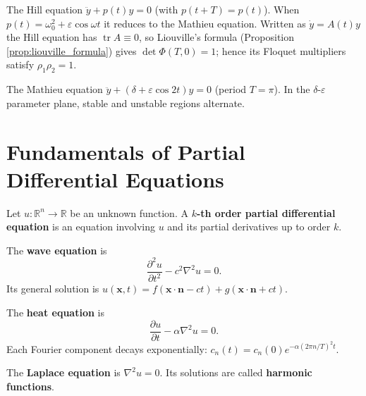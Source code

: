 \begin{example}\label{ex:hill_equation}
The Hill equation $\ddot{y} + p(t) y = 0$ (with $p(t+T) = p(t)$). When $p(t) = \omega_0^2 + \varepsilon \cos \omega t$ it reduces to the Mathieu equation. Written as $\dot y=A(t)y$ the Hill equation has $\operatorname{tr}A\equiv0$, so Liouville's formula (Proposition \ref{prop:liouville_formula}) gives $\det\Phi(T,0)=1$; hence its Floquet multipliers satisfy $\rho_1 \rho_2 = 1$.
\end{example}

\begin{example}\label{ex:mathieu}
The Mathieu equation $\ddot{y} + (\delta + \varepsilon \cos 2t) y = 0$ (period $T = \pi$). In the $\delta$-$\varepsilon$ parameter plane, stable and unstable regions alternate.
\end{example}

\section{Fundamentals of Partial Differential Equations}\label{sec:pde_basic}

\begin{definition}\label{def:pde}
Let $u: \mathbb{R}^n \to \mathbb{R}$ be an unknown function. A \textbf{$k$-th order partial differential equation} is an equation involving $u$ and its partial derivatives up to order $k$.
\end{definition}

\begin{definition}\label{def:wave_equation}
The \textbf{wave equation} is
\[
\frac{\partial^2 u}{\partial t^2} - c^2 \nabla^2 u = 0.
\]
Its general solution is $u(\mathbf{x}, t) = f(\mathbf{x} \cdot \mathbf{n} - ct) + g(\mathbf{x} \cdot \mathbf{n} + ct)$.
\end{definition}

\begin{definition}\label{def:heat_equation}
The \textbf{heat equation} is
\[
\frac{\partial u}{\partial t} - \alpha \nabla^2 u = 0.
\]
Each Fourier component decays exponentially: $c_n(t) = c_n(0) e^{-\alpha (2\pi n/T)^2 t}$.
\end{definition}

\begin{definition}\label{def:laplace_equation}
The \textbf{Laplace equation} is $\nabla^2 u = 0$. Its solutions are called \textbf{harmonic functions}.
\end{definition}

